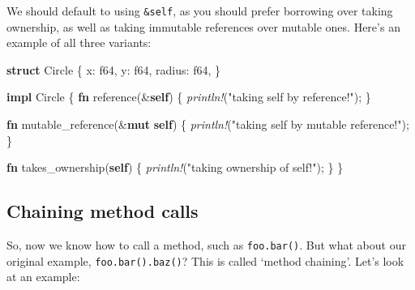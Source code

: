 \documentclass[a4paper,]{book}
\newenvironment{Shaded}{\begin{snugshade}}{\end{snugshade}}
\newcommand{\KeywordTok}[1]{\textcolor[rgb]{0.13,0.29,0.53}{\textbf{{#1}}}}
\newcommand{\DataTypeTok}[1]{\textcolor[rgb]{0.13,0.29,0.53}{{#1}}}
\newcommand{\StringTok}[1]{\textcolor[rgb]{0.31,0.60,0.02}{{#1}}}
\newcommand{\PreprocessorTok}[1]{\textcolor[rgb]{0.56,0.35,0.01}{\textit{{#1}}}}
\newcommand{\NormalTok}[1]{{#1}}
\begin{document}
We should default to using \texttt{\&self}, as you should prefer
borrowing over taking ownership, as well as taking immutable references
over mutable ones. Here's an example of all three variants:

\begin{Shaded}
\begin{Highlighting}[]
\KeywordTok{struct} \NormalTok{Circle \{}
    \NormalTok{x: }\DataTypeTok{f64}\NormalTok{,}
    \NormalTok{y: }\DataTypeTok{f64}\NormalTok{,}
    \NormalTok{radius: }\DataTypeTok{f64}\NormalTok{,}
\NormalTok{\}}

\KeywordTok{impl} \NormalTok{Circle \{}
    \KeywordTok{fn} \NormalTok{reference(&}\KeywordTok{self}\NormalTok{) \{}
       \PreprocessorTok{println!}\NormalTok{(}\StringTok{"taking self by reference!"}\NormalTok{);}
    \NormalTok{\}}

    \KeywordTok{fn} \NormalTok{mutable_reference(&}\KeywordTok{mut} \KeywordTok{self}\NormalTok{) \{}
       \PreprocessorTok{println!}\NormalTok{(}\StringTok{"taking self by mutable reference!"}\NormalTok{);}
    \NormalTok{\}}

    \KeywordTok{fn} \NormalTok{takes_ownership(}\KeywordTok{self}\NormalTok{) \{}
       \PreprocessorTok{println!}\NormalTok{(}\StringTok{"taking ownership of self!"}\NormalTok{);}
    \NormalTok{\}}
\NormalTok{\}}
\end{Highlighting}
\end{Shaded}

\subsection{Chaining method calls}\label{chaining-method-calls}

So, now we know how to call a method, such as \texttt{foo.bar()}. But
what about our original example, \texttt{foo.bar().baz()}? This is
called `method chaining'. Let's look at an example:
\end{document}
